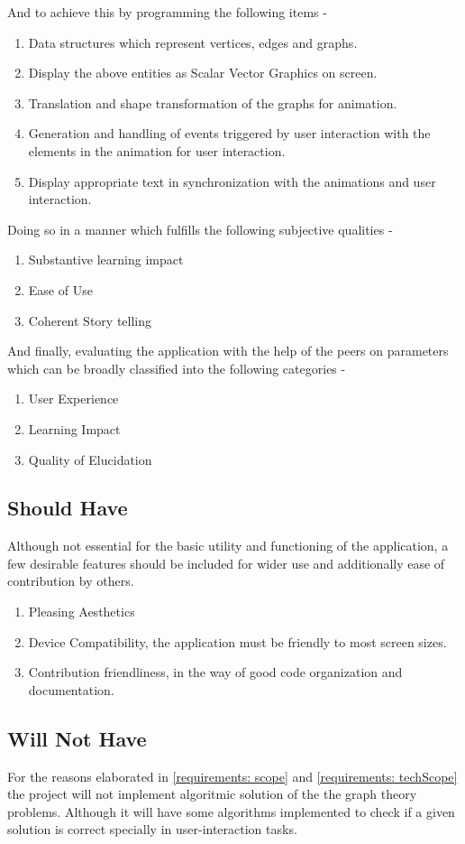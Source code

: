 And to achieve this by programming the following items -

\begin{enumerate}
\item Data structures which represent vertices, edges and graphs.
\item Display the above entities as Scalar Vector Graphics on screen.
\item Translation and shape transformation of the graphs for animation.
\item Generation and handling of events triggered by user interaction with the elements in the animation for user interaction.
\item Display appropriate text in synchronization with the animations and user interaction.
\end{enumerate}

Doing so in a manner which fulfills the following subjective qualities -

\begin{enumerate}
\item Substantive learning impact
\item Ease of Use
\item Coherent Story telling
\end{enumerate}

And finally, evaluating the application with the help of the peers on
parameters which can be broadly classified into the following categories -

\begin{enumerate}
\item User Experience
\item Learning Impact
\item Quality of Elucidation
\end{enumerate}

\subsection{Should Have}
\label{requirements: shouldhave}
Although not essential for the basic utility and functioning of
the application, a few desirable features should be included for wider use and
additionally ease of contribution by others. 
\begin{enumerate}
\item Pleasing Aesthetics
\item Device Compatibility, the application must be friendly to most screen sizes.
\item Contribution friendliness, in the way of good code organization and documentation.
\end{enumerate}

\subsection{Will Not Have}
\label{requirements: willnothave}
For the reasons elaborated in \autoref{requirements: scope} and
\autoref{requirements: techScope} the project will not implement algoritmic
solution of the the graph theory problems.  Although it will have some
algorithms implemented to check if a given solution is correct specially in
user-interaction tasks.
